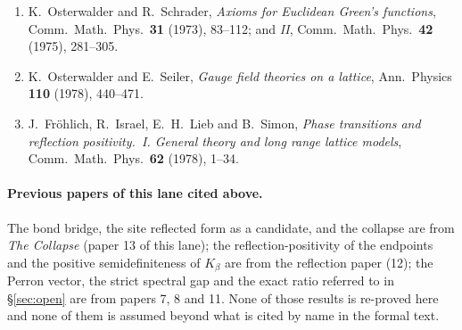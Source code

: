 \documentclass[11pt]{article}
\theoremstyle{definition}
\begin{document}
\begin{enumerate}\itemsep2pt
\item K.~Osterwalder and R.~Schrader, \emph{Axioms for Euclidean Green's
functions}, Comm.\ Math.\ Phys.\ \textbf{31} (1973), 83--112; and
\emph{II}, Comm.\ Math.\ Phys.\ \textbf{42} (1975), 281--305.
\item K.~Osterwalder and E.~Seiler, \emph{Gauge field theories on a lattice},
Ann.\ Physics \textbf{110} (1978), 440--471.
\item J.~Fr\"ohlich, R.~Israel, E.~H.~Lieb and B.~Simon, \emph{Phase
transitions and reflection positivity.~I. General theory and long range lattice
models}, Comm.\ Math.\ Phys.\ \textbf{62} (1978), 1--34.
\end{enumerate}

\small
\paragraph{Previous papers of this lane cited above.}  The bond bridge, the site
reflected form as a candidate, and the collapse are from \emph{The Collapse}
(paper 13 of this lane); the reflection-positivity of the endpoints and the
positive semidefiniteness of $K_\beta$ are from the reflection paper (12); the
Perron vector, the strict spectral gap and the exact ratio referred to in
\S\ref{sec:open} are from papers 7, 8 and 11.  None of those results is
re-proved here and none of them is assumed beyond what is cited by name in the
formal text.
\end{document}
